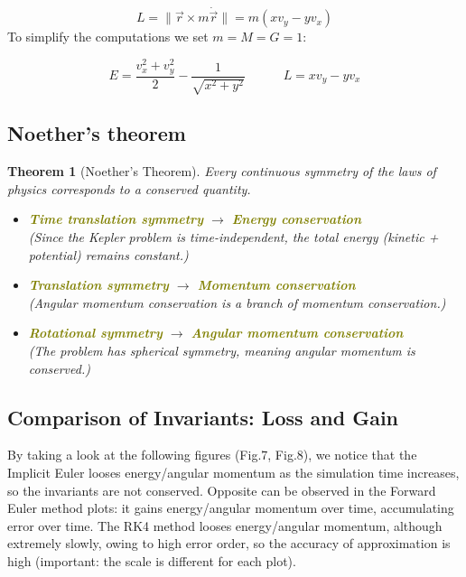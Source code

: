 \documentclass[11pt]{article}
\newtheorem{theorem}{Theorem}[section]
\begin{document}
\[
L = \|\vec{r} \times m\dot{\vec{r}}\| = m(xv_y - yv_x)
\]
To simplify the computations we set $m = M = G = 1$:

\[
E = \frac{v_x^2 + v_y^2}{2} - \frac{1}{\sqrt{x^2 + y^2}}
\quad \quad \quad
L = xv_y - yv_x
\]


\subsection{Noether's theorem}

\begin{theorem}[Noether’s Theorem] Every continuous symmetry of the laws of physics corresponds to a conserved quantity.

\begin{itemize}
    \item \textcolor{olive}{\textbf{Time translation symmetry}} $\longrightarrow$ \textcolor{olive}{\textbf{Energy conservation}} \\
    (Since the Kepler problem is time-independent, the total energy (kinetic + potential) remains constant.)
    
    \item \textcolor{olive}{\textbf{Translation symmetry}} $\longrightarrow$ \textcolor{olive}{\textbf{Momentum conservation}} \\
    (Angular momentum conservation is a branch of momentum conservation.)
    
    \item \textcolor{olive}{\textbf{Rotational symmetry}} $\longrightarrow$ \textcolor{olive}{\textbf{Angular momentum conservation}} \\
    (The problem has spherical symmetry, meaning angular momentum is conserved.)
\end{itemize}
\end{theorem}
\vspace{0.5cm}


\subsection{Comparison of Invariants: Loss and Gain}

By taking a look at the following figures (Fig.7, Fig.8), we notice that the Implicit Euler looses energy/angular momentum as the simulation time increases, so the invariants are not conserved. Opposite can be observed in the Forward Euler method plots: it gains energy/angular momentum over time, accumulating error over time. The RK4 method looses energy/angular momentum, although extremely slowly, owing to high error order, so the accuracy of approximation is high (important: the scale is different for each plot).
\end{document}
